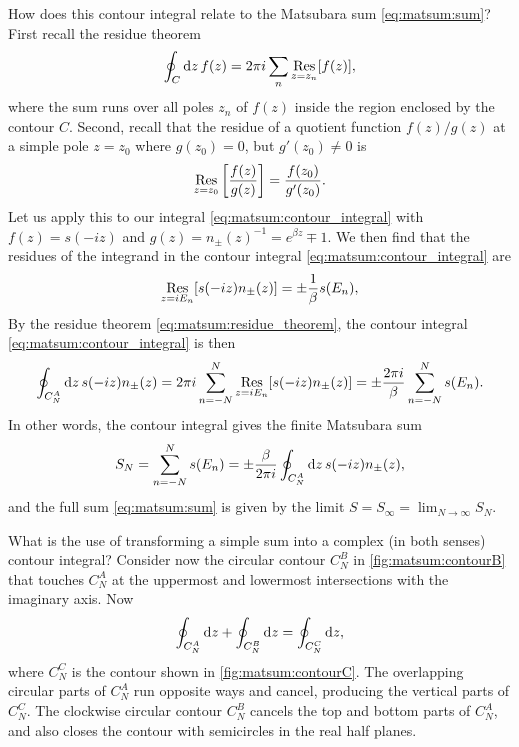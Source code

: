 How does this contour integral relate to the Matsubara sum \eqref{eq:matsum:sum}?
First recall the residue theorem
\begin{equation}
	\oint_C \mathop{}\!\mathrm{d} z \, f(z) = 2 \pi i \sum_n \operatorname*{Res}_{z=z_n} [f(z)] ,
\label{eq:matsum:residue_theorem}
\end{equation}
where the sum runs over all poles $z_n$ of $f(z)$ inside the region enclosed by the contour $C$.
Second, recall that the residue of a quotient function $f(z) / g(z)$ at a simple pole $z = z_0$ where $g(z_0) = 0$, but $g'(z_0) \neq 0$ is 
\begin{equation}
	\operatorname*{Res}_{z=z_0} \left[ \frac{f(z)}{g(z)} \right] = \frac{f(z_0)}{g'(z_0)} .
\label{eq:matsum:residue_quotient}
\end{equation}
Let us apply this to our integral \eqref{eq:matsum:contour_integral} with $f(z) = s(-iz)$ and $g(z) = n_\pm(z)^{-1} = e^{\beta z} \mp 1$.
We then find that the residues of the integrand in the contour integral \eqref{eq:matsum:contour_integral} are
\begin{equation}
	\operatorname*{Res}_{z = i E_n} [s(-iz) n_\pm(z)] = \pm \frac{1}{\beta} s(E_n) ,
\end{equation}
By the residue theorem \eqref{eq:matsum:residue_theorem}, the contour integral \eqref{eq:matsum:contour_integral} is then
\begin{equation}
	\oint_{C_N^A} \mathop{}\!\mathrm{d} z \, s(-iz) n_\pm(z) = 2 \pi i \sum_{n=-N}^N \operatorname*{Res}_{z = i E_n}[s(-i z) n_\pm(z)]
	                                  = \pm \frac{2 \pi i}{\beta} \sum_{n=-N}^N s(E_n) .
\label{eq:matsum:connection_integral_sum}
\end{equation}
In other words, the contour integral gives the finite Matsubara sum
\begin{equation}
	S_N = \sum_{n=-N}^N s(E_n) = \pm \frac{\beta}{2 \pi i} \oint_{C_N^A} \mathop{}\!\mathrm{d} z \, s(-iz) n_\pm(z) ,
\label{eq:matsum:sum_as_contour_integral}
\end{equation}
and the full sum \eqref{eq:matsum:sum} is given by the limit $S = S_\infty = \lim_{N \rightarrow \infty} S_N$.

What is the use of transforming a simple sum into a complex (in both senses) contour integral?
Consider now the circular contour $C_N^B$ in \cref{fig:matsum:contourB} that touches $C_N^A$ at the uppermost and lowermost intersections with the imaginary axis.
Now
\begin{equation}
	\oint_{C_N^A} \mathop{}\!\mathrm{d} z +
	\oint_{C_N^B} \mathop{}\!\mathrm{d} z =
	\oint_{C_N^C} \mathop{}\!\mathrm{d} z ,
\label{eq:matsum:contour_superposition}
\end{equation}
where $C_N^C$ is the contour shown in \cref{fig:matsum:contourC}.
The overlapping circular parts of $C_N^A$ run opposite ways and cancel, producing the vertical parts of $C_N^C$.
The clockwise circular contour $C_N^B$ cancels the top and bottom parts of $C_N^A$, and also closes the contour with semicircles in the real half planes.

